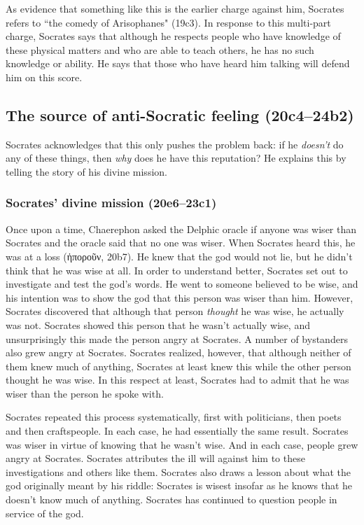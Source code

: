 \documentclass[11pt]{article}
\begin{document}
As evidence that something like this is the earlier charge against him, Socrates refers to ``the comedy of Arisophanes" (19c3).  In response to this multi-part charge, Socrates says that although he respects people who have knowledge of these physical matters and who are able to teach others, he has no such knowledge or ability.  He says that those who have heard him talking will defend him on this score.

\subsection{The source of anti-Socratic feeling (20c4--24b2)}

Socrates acknowledges that this only pushes the problem back: if he \emph{doesn't} do any of these things, then \emph{why} does he have this reputation?  He explains this by telling the story of his divine mission.

\subsubsection{Socrates' divine mission (20e6--23c1)}

Once upon a time, Chaerephon asked the Delphic oracle if anyone was wiser than Socrates and the oracle said that no one was wiser.  When Socrates heard this, he was at a loss (ἠποροῦν, 20b7).  He knew that the god would not lie, but he didn't think that he was wise at all.  In order to understand better, Socrates set out to investigate and test the god's words.  He went to someone believed to be wise, and his intention was to show the god that this person was wiser than him.  However, Socrates discovered that although that person \emph{thought} he was wise, he actually was not.  Socrates showed this person that he wasn't actually wise, and unsurprisingly this made the person angry at Socrates.  A number of bystanders also grew angry at Socrates.  Socrates realized, however, that although neither of them knew much of anything, Socrates at least knew this while the other person thought he was wise. In this respect at least, Socrates had to admit that he was wiser than the person he spoke with.

Socrates repeated this process systematically, first with politicians, then poets and then craftspeople.  In each case, he had essentially the same result.  Socrates was wiser in virtue of knowing that he wasn't wise.  And in each case, people grew angry at Socrates.  Socrates attributes the ill will against him to these investigations and others like them.  Socrates also draws a lesson about what the god originally meant by his riddle: Socrates is wisest insofar as he knows that he doesn't know much of anything.  Socrates has continued to question people in service of the god.
\end{document}
